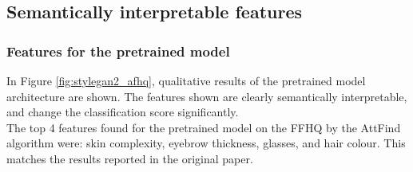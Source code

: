 \subsection{Semantically interpretable features}
\label{sec:claim2}
\subsubsection{Features for the pretrained model}
In Figure \ref{fig:stylegan2_afhq}, qualitative results of the pretrained model architecture are shown. The features shown are clearly semantically interpretable, and change the classification score significantly. \\
The top 4 features found for the pretrained model on the FFHQ by the AttFind algorithm were: skin complexity, eyebrow thickness, glasses, and hair colour. This matches the results reported in the original paper.
